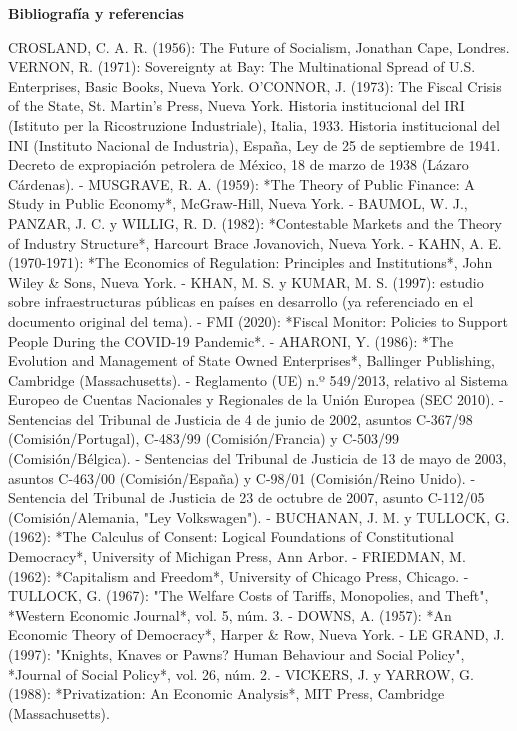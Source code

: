 \documentclass[10pt,a4paper]{article}
\newcounter{myref}
\newcommand{\MyBibliography}{%
  \clearpage
  \phantomsection
  {\centering\bfseries\Large Bibliografía y referencias\par}%
  \medskip
  \addcontentsline{stc}{section}{Bibliografía y referencias}%
  \setcounter{myref}{0}%
}
\begin{document}
\clearpage
{}
\MyBibliography


CROSLAND, C. A. R. (1956): The Future of Socialism, Jonathan Cape, Londres.
VERNON, R. (1971): Sovereignty at Bay: The Multinational Spread of U.S. Enterprises, Basic Books, Nueva York.
O'CONNOR, J. (1973): The Fiscal Crisis of the State, St. Martin's Press, Nueva York.
Historia institucional del IRI (Istituto per la Ricostruzione Industriale), Italia, 1933.
Historia institucional del INI (Instituto Nacional de Industria), España, Ley de 25 de septiembre de 1941.
Decreto de expropiación petrolera de México, 18 de marzo de 1938 (Lázaro Cárdenas).
- MUSGRAVE, R. A. (1959): *The Theory of Public Finance: A Study in Public Economy*, McGraw-Hill, Nueva York.
- BAUMOL, W. J., PANZAR, J. C. y WILLIG, R. D. (1982): *Contestable Markets and the Theory of Industry Structure*, Harcourt Brace Jovanovich, Nueva York.
- KAHN, A. E. (1970-1971): *The Economics of Regulation: Principles and Institutions*, John Wiley & Sons, Nueva York.
- KHAN, M. S. y KUMAR, M. S. (1997): estudio sobre infraestructuras públicas en países en desarrollo (ya referenciado en el documento original del tema).
- FMI (2020): *Fiscal Monitor: Policies to Support People During the COVID-19 Pandemic*.
- AHARONI, Y. (1986): *The Evolution and Management of State Owned Enterprises*, Ballinger Publishing, Cambridge (Massachusetts).
- Reglamento (UE) n.º 549/2013, relativo al Sistema Europeo de Cuentas Nacionales y Regionales de la Unión Europea (SEC 2010).
- Sentencias del Tribunal de Justicia de 4 de junio de 2002, asuntos C-367/98 (Comisión/Portugal), C-483/99 (Comisión/Francia) y C-503/99 (Comisión/Bélgica).
- Sentencias del Tribunal de Justicia de 13 de mayo de 2003, asuntos C-463/00 (Comisión/España) y C-98/01 (Comisión/Reino Unido).
- Sentencia del Tribunal de Justicia de 23 de octubre de 2007, asunto C-112/05 (Comisión/Alemania, "Ley Volkswagen").
- BUCHANAN, J. M. y TULLOCK, G. (1962): *The Calculus of Consent: Logical Foundations of Constitutional Democracy*, University of Michigan Press, Ann Arbor.
- FRIEDMAN, M. (1962): *Capitalism and Freedom*, University of Chicago Press, Chicago.
- TULLOCK, G. (1967): "The Welfare Costs of Tariffs, Monopolies, and Theft", *Western Economic Journal*, vol. 5, núm. 3.
- DOWNS, A. (1957): *An Economic Theory of Democracy*, Harper & Row, Nueva York.
- LE GRAND, J. (1997): "Knights, Knaves or Pawns? Human Behaviour and Social Policy", *Journal of Social Policy*, vol. 26, núm. 2.
- VICKERS, J. y YARROW, G. (1988): *Privatization: An Economic Analysis*, MIT Press, Cambridge (Massachusetts).
\end{document}
